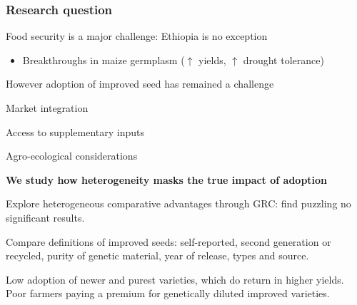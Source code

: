 \documentclass{beamer}
\begin{document}
\begin{frame}
\frametitle{Research question}

Food security is a major challenge: Ethiopia is no exception

\begin{itemize}
    \item Breakthroughs in maize germplasm ($\uparrow$ yields, $\uparrow$ drought tolerance)
\end{itemize}

However adoption of improved seed has remained a challenge

\begin{enumerate}[ {[}1{]} ]
    \item Market integration
    \item Access to supplementary inputs
    \item Agro-ecological considerations
\end{enumerate}

\textbf{We study how heterogeneity masks the true impact of adoption}

\begin{enumerate}[ {[}1{]} ]
    \item Explore heterogeneous comparative advantages through GRC: find puzzling no significant results.
    \item Compare definitions of improved seeds: self-reported, second generation or recycled, purity of genetic material, year of release, types and source.
    \item Low adoption of newer and purest varieties, which do return in higher yields. Poor farmers paying a premium for genetically diluted improved varieties.
\end{enumerate}

\end{frame}
\end{document}
